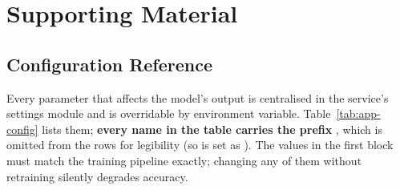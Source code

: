 \chapter{Supporting Material}
\label{app:a}

\section{Configuration Reference}
\label{app:config}

Every parameter that affects the model's output is centralised in the service's
settings module and is overridable by environment variable.
Table~\ref{tab:app-config} lists them; \textbf{every name in the table carries
the prefix }, which is omitted from the rows for legibility (so
 is set as ). The values in the first
block must match the training pipeline exactly; changing any of them without
retraining silently degrades accuracy.

